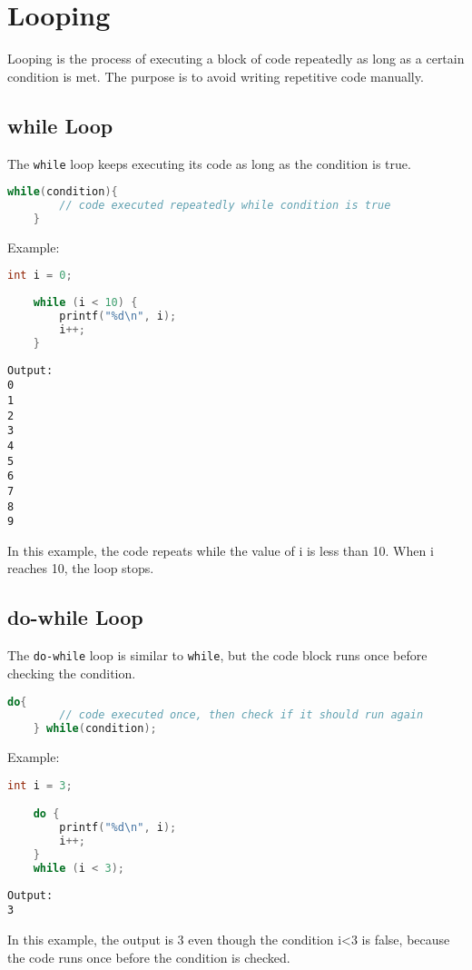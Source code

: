 \section{Looping}

Looping is the process of executing a block of code repeatedly as long as a certain condition is met.  
The purpose is to avoid writing repetitive code manually.

\subsection{while Loop}

The \verb|while| loop keeps executing its code as long as the condition is true.

{
\captionsetup[lstlisting]{labelformat=empty, justification=raggedright, singlelinecheck=false}
\begin{lstlisting}[language=c, caption={Syntax}]
	while(condition){
		// code executed repeatedly while condition is true
	}
\end{lstlisting}
}
Example:
\begin{lstlisting}[language=c]
	int i = 0;
	
	while (i < 10) {
		printf("%d\n", i);
		i++;
	}
\end{lstlisting}
\begin{verbatim}
Output:
0
1
2
3
4
5
6
7
8
9
\end{verbatim}
In this example, the code repeats while the value of i is less than 10.  
When i reaches 10, the loop stops.

\subsection{do-while Loop}

The \verb|do-while| loop is similar to \verb|while|, but the code block runs once before checking the condition.

{
\captionsetup[lstlisting]{labelformat=empty, justification=raggedright, singlelinecheck=false}
\begin{lstlisting}[language=c, caption={Syntax}]
	do{
		// code executed once, then check if it should run again
	} while(condition);
\end{lstlisting}
}
Example:
\begin{lstlisting}[language=c]
	int i = 3;

	do {
		printf("%d\n", i);
		i++;
	}
	while (i < 3);
\end{lstlisting}
\begin{verbatim}
Output:
3
\end{verbatim}
In this example, the output is 3 even though the condition i<3 is false, because the code runs once before the condition is checked.

